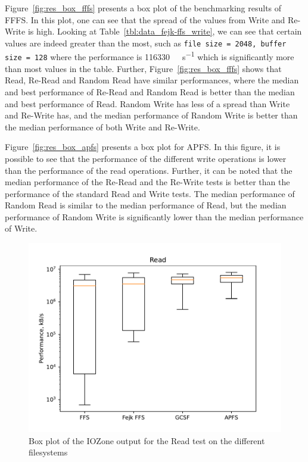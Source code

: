 Figure~\ref{fig:res_box_fffs} presents a box plot of the benchmarking results of \gls{FFFS}. In this plot, one can see that the spread of the values from Write and \mbox{Re-Write} is high. Looking at Table~\ref{tbl:data_fejk-ffs_write}, we can see that certain values are indeed greater than the most, such as \texttt{file size = 2048, buffer size = 128} where the performance is \SI[per-mode = symbol]{116330}{\kilo\byte\per\second} which is significantly more than most values in the table. Further, Figure~\ref{fig:res_box_fffs} shows that Read, \mbox{Re-Read} and Random Read have similar performances, where the median and best performance of \mbox{Re-Read} and Random Read is better than the median and best performance of Read. Random Write has less of a spread than Write and \mbox{Re-Write} has, and the median performance of Random Write is better than the median performance of both Write and \mbox{Re-Write}.

Figure~\ref{fig:res_box_apfs} presents a box plot for \gls{APFS}. In this figure, it is possible to see that the performance of the different write operations is lower than the performance of the read operations. Further, it can be noted that the median performance of the \mbox{Re-Read} and the \mbox{Re-Write} tests is better than the performance of the standard Read and Write tests. The median performance of Random Read is similar to the median performance of Read, but the median performance of Random Write is significantly lower than the median performance of Write.

\begin{figure}[!htb]
	\label{fig:res_box_read}
	\begin{center}
		\includegraphics[width=1.0\textwidth]{figures/benchmarking/Read_box.pdf}
	\end{center}
	\caption{Box plot of the IOZone output for the Read test on the different filesystems}
\end{figure}

